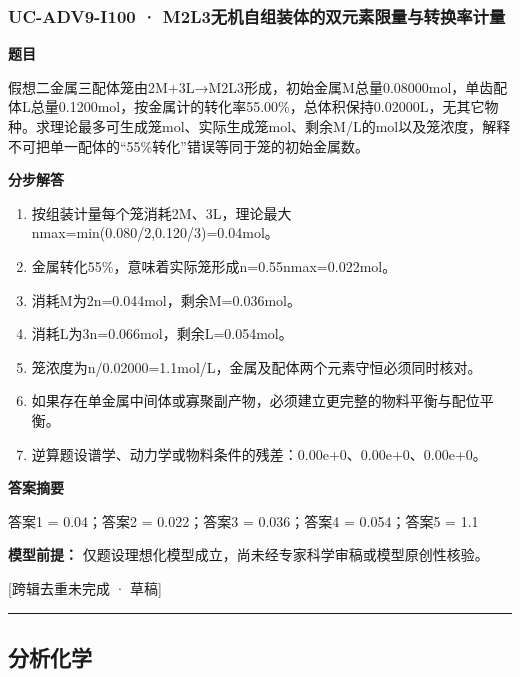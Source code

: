 \documentclass[UTF8,11pt,a4paper]{ctexart}
\begin{document}
\subsubsection*{UC-ADV9-I100 · M2L3无机自组装体的双元素限量与转换率计量}
\noindent\textbf{题目}\par
假想二金属三配体笼由2M+3L→M2L3形成，初始金属M总量0.08000mol，单齿配体L总量0.1200mol，按金属计的转化率55.00\%，总体积保持0.02000L，无其它物种。求理论最多可生成笼mol、实际生成笼mol、剩余M/L的mol以及笼浓度，解释不可把单一配体的“55\%转化”错误等同于笼的初始金属数。\par
\medskip\noindent\textbf{分步解答}
\begin{enumerate}
\item 按组装计量每个笼消耗2M、3L，理论最大nmax=min(0.080/2,0.120/3)=0.04mol。
\item 金属转化55\%，意味着实际笼形成n=0.55nmax=0.022mol。
\item 消耗M为2n=0.044mol，剩余M=0.036mol。
\item 消耗L为3n=0.066mol，剩余L=0.054mol。
\item 笼浓度为n/0.02000=1.1mol/L，金属及配体两个元素守恒必须同时核对。
\item 如果存在单金属中间体或寡聚副产物，必须建立更完整的物料平衡与配位平衡。
\item 逆算题设谱学、动力学或物料条件的残差：0.00e+0、0.00e+0、0.00e+0。
\end{enumerate}
\noindent\textbf{答案摘要}\par
答案1 = 0.04；答案2 = 0.022；答案3 = 0.036；答案4 = 0.054；答案5 = 1.1\par
\noindent\textbf{模型前提：}
仅题设理想化模型成立，尚未经专家科学审稿或模型原创性核验。\par
\noindent\textcolor{red!65!black}{[跨辑去重未完成 · 草稿]} \par
\medskip\hrule\medskip
\subsection*{分析化学}
\end{document}
